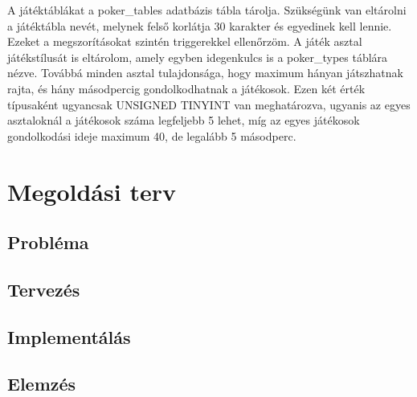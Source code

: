A játéktáblákat a poker\_tables adatbázis tábla tárolja. Szükségünk van eltárolni a játéktábla nevét, melynek felső korlátja 30 karakter és egyedinek kell lennie. Ezeket a megszorításokat szintén triggerekkel ellenőrzöm. A játék asztal játékstílusát is eltárolom, amely egyben idegenkulcs is a poker\_types táblára nézve. Továbbá minden asztal tulajdonsága, hogy maximum hányan játszhatnak rajta, és hány másodpercig gondolkodhatnak a játékosok. Ezen két érték típusaként ugyancsak UNSIGNED TINYINT van meghatározva, ugyanis az egyes asztaloknál a játékosok száma legfeljebb 5 lehet, míg az egyes játékosok gondolkodási ideje maximum 40, de legalább 5 másodperc.

\section{Megoldási terv}
\subsection{Probléma}
\subsection{Tervezés}
\subsection{Implementálás}
\subsection{Elemzés}

